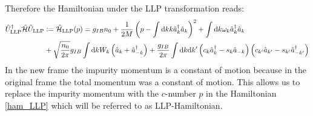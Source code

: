 Therefore the Hamiltonian under the LLP transformation reads:
\begin{align}\label{ham_LLP}
\hat U_{\mathrm{LLP}}^\dagger\hat{\mathcal{H}}\hat U_{\mathrm{LLP}} &\vcentcolon= \hat{\mathcal{H}}_{\mathrm{LLP}}(p) =g_{IB}n_0+\frac{1}{2M}\left(p-\int\mathrm d k k \hat a^\dagger_k\hat a_k \right)^2+\int\mathrm d k\omega_{ k}\hat a^\dagger_{ k}\hat a_{ k}\\
&+\sqrt{\frac{n_0}{2\pi}}g_{IB}\int \mathrm d k W_k \left(\hat a_{ k}+\hat a^\dagger_{- k}\right) + \frac{g_{IB}}{2\pi}\int\mathrm d k\mathrm d k^\prime \left(c_k\hat a^\dagger_k-s_k\hat a_{-k}\right)\left(c_{k^\prime}\hat a_{k^\prime}-s_{k^\prime}\hat a^\dagger_{-k^\prime}\right)\nonumber
\end{align}
In the new frame the impurity momentum is a constant of motion because in the original frame the total momentum was a constant of motion. This allows us to replace the impurity momentum with the $c$-number $p$ in the Hamiltonian \ref{ham_LLP} which will be referred to as LLP-Hamiltonian.


